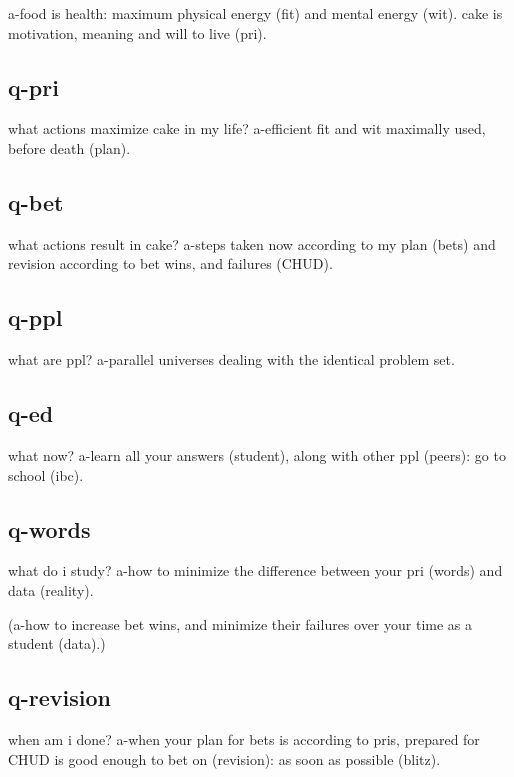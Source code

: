 \documentclass[
]{book}
\begin{document}
a-food is health: maximum physical energy (fit) and mental energy (wit).
cake is motivation, meaning and will to live (pri).

\hypertarget{q-pri}{%
\subsection{q-pri}\label{q-pri}}

what actions maximize cake in my life?
a-efficient fit and wit maximally used, before death (plan).

\hypertarget{q-bet}{%
\subsection{q-bet}\label{q-bet}}

what actions result in cake?
a-steps taken now according to my plan (bets) and revision according to bet wins, and failures (CHUD).

\hypertarget{q-ppl}{%
\subsection{q-ppl}\label{q-ppl}}

what are ppl?
a-parallel universes dealing with the identical problem set.

\hypertarget{q-ed}{%
\subsection{q-ed}\label{q-ed}}

what now?
a-learn all your answers (student), along with other ppl (peers): go to school (ibc).

\hypertarget{q-words}{%
\subsection{q-words}\label{q-words}}

what do i study?
a-how to minimize the difference between your pri (words) and data (reality).

(a-how to increase bet wins, and minimize their failures over your time as a student (data).)

\hypertarget{q-revision}{%
\subsection{q-revision}\label{q-revision}}

when am i done?
a-when your plan for bets is according to pris, prepared for CHUD is good enough to bet on (revision): as soon as possible (blitz).
\end{document}
